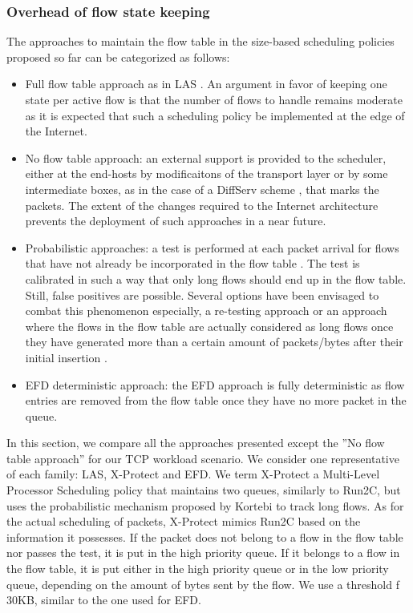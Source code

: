 \documentclass[preprint,12pt]{elsarticle}
\begin{document}
\subsubsection{Overhead of flow state keeping}\label{sec:table_size}
The approaches to maintain the flow table in the size-based scheduling policies proposed so far can be categorized as follows: %
\begin{itemize}
 \item Full flow table approach as in LAS \cite{Rai04size-basedscheduling}. An argument in favor of keeping one state per active flow is that the number of flows to handle remains moderate as it is expected that such a scheduling policy be implemented at the edge of the Internet.
\item No flow table approach: an external support is provided to the scheduler, either at the end-hosts by modificaitons of the transport layer \cite{Avrachenkov04Run2c} or by some intermediate boxes, as in the case of a DiffServ scheme \cite{Noureddine02improvingthe}, that marks the packets. The extent of the changes required to the Internet architecture prevents the deployment of such approaches in a near future.
\item Probabilistic approaches:  a test is performed at each packet arrival for flows that have not already be incorporated in the flow table \cite{DivakaranCAP10,Kortebi04Xprotect,Psounis05Sift}. The test is calibrated in such a way that only long flows should end up in the flow table. Still, false positives are possible. Several options have been envisaged to combat this phenomenon especially, a re-testing approach \cite{Psounis05Sift} or an approach where the flows in the flow table are actually considered as long flows once they have generated more than a certain amount of packets/bytes after their initial insertion \cite{DivakaranCAP10}.
\item EFD deterministic approach:  the EFD approach is fully deterministic as flow entries are removed from the flow table once they have no more packet in the queue. 
\end{itemize}

In this section, we compare all the approaches presented except the ''No flow table approach'' for our TCP workload scenario. We consider one representative of each family: LAS, X-Protect and EFD. We term X-Protect a Multi-Level Processor Scheduling policy that maintains two queues, similarly to Run2C, but uses the probabilistic mechanism proposed by Kortebi \cite{Kortebi04Xprotect} to track long flows. As for the actual scheduling of packets, X-Protect mimics Run2C based on the information it possesses. If the packet does not belong to a flow in the flow table nor passes the test, it is put in the high priority queue. If it belongs to a flow in the flow table, it is put either in the high priority queue or in the low priority queue, depending on the amount of bytes sent by the flow. We use a threshold f 30KB, similar to the one used for EFD.
\end{document}
